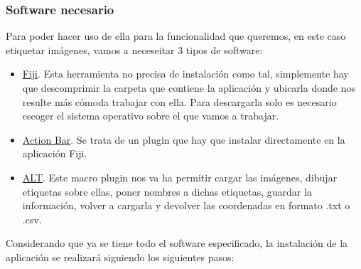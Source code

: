 \subsubsection{Software necesario}
Para poder hacer uso de ella para la funcionalidad que queremos, en este caso etiquetar imágenes, vamos a neceseitar 3 tipos de software:
\begin{itemize}
	\item \href{http://fiji.sc/#download}{Fiji}. Esta herramienta no precisa de instalación como tal, simplemente hay que descomprimir la carpeta que contiene la aplicación y ubicarla donde nos resulte más cómoda trabajar con ella.
	Para descargarla solo es necesario escoger el sistema operativo sobre el que vamos a trabajar.
	\item \href{https://github.com/imagejan/ActionBar/releases/download/SciJava-Parameters/action_bar-2.0.5-SNAPSHOT.jar}{Action Bar}. Se trata de un plugin que hay que instalar directamente en la aplicación Fiji.
	\item \href{https://www.dropbox.com/s/ihkr0ahhif3csvp/ALT_Windows_22mar2017.zip?dl=0}{ALT}. Este macro plugin nos va ha permitir cargar las imágenes, dibujar etiquetas sobre ellas, poner nombres a dichas etiquetas, guardar la información, volver a cargarla y devolver las coordenadas en formato .txt o .csv.
\end{itemize}
Considerando que ya se tiene todo el software especificado,
la instalación de la aplicación se realizará siguiendo los siguientes pasos:
